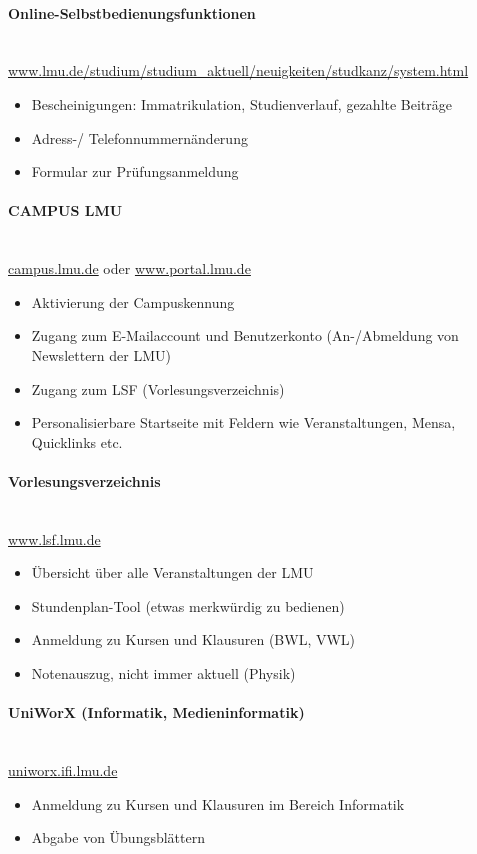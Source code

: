 \documentclass[twoside,12pt,parskip=half-]{scrartcl}
\begin{document}
\paragraph{Online-Selbstbedienungsfunktionen}\hfill\\
\url{www.lmu.de/studium/studium_aktuell/neuigkeiten/studkanz/system.html}
\begin{itemize}
	\item Bescheinigungen: Immatrikulation, Studienverlauf, gezahlte Beiträge
	\item Adress-/ Telefonnummernänderung
	\item Formular zur Prüfungsanmeldung
\end{itemize}

\paragraph{CAMPUS LMU}\hfill\\
\url{campus.lmu.de} oder \url{www.portal.lmu.de}
\begin{itemize}
	\item Aktivierung der Campuskennung
	\item Zugang zum E-Mailaccount und Benutzerkonto (An-/Abmeldung von Newslettern der LMU)
	\item Zugang zum LSF (Vorlesungsverzeichnis)
	\item Personalisierbare Startseite mit Feldern wie Veranstaltungen, Mensa, Quicklinks etc.
\end{itemize}

\paragraph{Vorlesungsverzeichnis}\hfill\\
\url{www.lsf.lmu.de}
\begin{itemize}
	\item Übersicht über alle Veranstaltungen der LMU
	\item Stundenplan-Tool (etwas merkwürdig zu bedienen)
	\item Anmeldung zu Kursen und Klausuren (BWL, VWL)
        \item Notenauszug, nicht immer aktuell (Physik)
\end{itemize}

\paragraph{UniWorX (Informatik, Medieninformatik)}\hfill\\
\url{uniworx.ifi.lmu.de}
\begin{itemize}
	\item Anmeldung zu Kursen und Klausuren im Bereich Informatik
	\item Abgabe von Übungsblättern
\end{itemize}
\end{document}
